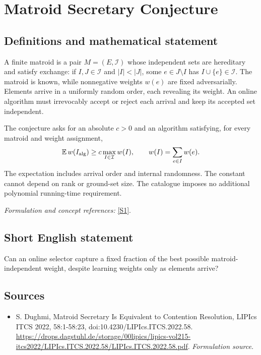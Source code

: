 \documentclass[11pt]{article}
\begin{document}
\section*{\texorpdfstring{Matroid Secretary Conjecture}{Matroid Secretary Conjecture}}\label{432}
\subsection{Definitions and mathematical statement}
A finite matroid is a pair $M=(E,\mathcal I)$ whose independent sets are hereditary and satisfy exchange: if $I,J\in\mathcal I$ and $|I|<|J|$, some $e\in J\setminus I$ has $I\cup\{e\}\in\mathcal I$. The matroid is known, while nonnegative weights $w(e)$ are fixed adversarially. Elements arrive in a uniformly random order, each revealing its weight. An online algorithm must irrevocably accept or reject each arrival and keep its accepted set independent.

The conjecture asks for an absolute $c>0$ and an algorithm satisfying, for every matroid and weight assignment,
\[
 {\mathbb{E}}\,w(I_{\rm alg})\ge c\max_{I\in\mathcal I}w(I),
 \qquad w(I)=\sum_{e\in I}w(e).
\]
The expectation includes arrival order and internal randomness. The constant cannot depend on rank or ground-set size. The catalogue imposes no additional polynomial running-time requirement.
\par\smallskip\textit{Formulation and concept references:} \href{https://drops.dagstuhl.de/storage/00lipics/lipics-vol215-itcs2022/LIPIcs.ITCS.2022.58/LIPIcs.ITCS.2022.58.pdf}{[S1]}.

\subsection{Short English statement}
Can an online selector capture a fixed fraction of the best possible matroid-independent weight, despite learning weights only as elements arrive?
\subsection{Sources}
\begin{itemize}
\item[S1]S. Dughmi, Matroid Secretary Is Equivalent to Contention Resolution, LIPIcs ITCS 2022, 58:1-58:23, doi:10.4230/LIPIcs.ITCS.2022.58.
\url{https://drops.dagstuhl.de/storage/00lipics/lipics-vol215-itcs2022/LIPIcs.ITCS.2022.58/LIPIcs.ITCS.2022.58.pdf}.
\textit{Formulation source.}
\end{itemize}
\end{document}
